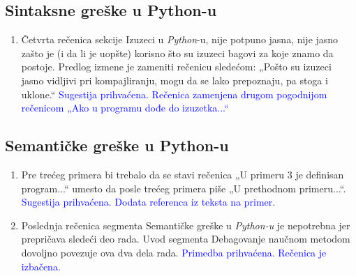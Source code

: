 \documentclass[a4paper]{report}
\newcommand{\odgovor}[1]{\textcolor{blue}{#1}}
\begin{document}
\subsection{Sintaksne greške u Python-u}
\begin{enumerate}
    \item Četvrta rečenica sekcije Izuzeci u \emph{Python}-u, nije potpuno jasna, nije jasno zašto je (i da li je uopšte) korisno što su izuzeci bagovi za koje znamo da postoje. Predlog izmene je zameniti rečenicu sledećom:
    „Pošto su izuzeci jasno vidljivi pri kompajliranju, mogu da se lako prepoznaju, pa stoga i uklone.“
    \odgovor{Sugestija prihvaćena. Rečenica zamenjena drugom pogodnijom rečenicom „Ako u programu dođe do izuzetka...“}
\end{enumerate}
\subsection{Semantičke greške u Python-u}
\begin{enumerate}
    \item Pre trećeg primera bi trebalo da se stavi rečenica „U primeru 3 je definisan program...“ umesto da posle trećeg primera piše „U prethodnom primeru...“.
    \odgovor{Sugestija prihvaćena. Dodata referenca iz teksta na primer.}
    \item Poslednja rečenica segmenta Semantičke greške u \emph{Python-u} je nepotrebna jer prepričava sledeći deo rada. Uvod segmenta Debagovanje naučnom metodom dovoljno povezuje ova dva dela rada.
    \odgovor{Primedba prihvaćena. Rečenica je izbačena.}
\end{enumerate}
\end{document}
